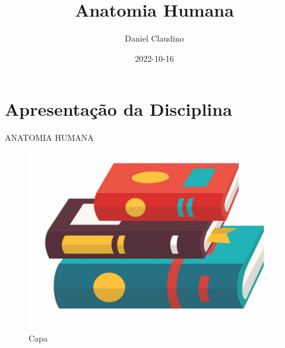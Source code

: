 \documentclass[
]{book}
\title{Anatomia Humana}
\author{Daniel Claudino}
\date{2022-10-16}
\begin{document}
\maketitle

{
\setcounter{tocdepth}{1}
\tableofcontents
}
\hypertarget{apresentauxe7uxe3o-da-disciplina}{%
\chapter{Apresentação da Disciplina}\label{apresentauxe7uxe3o-da-disciplina}}

ANATOMIA HUMANA

\begin{figure}

{\centering \includegraphics[width=0.5\linewidth]{figuras/LIVRO-GENERICO} 

}

\caption{Capa}\label{fig:unnamed-chunk-1}
\end{figure}
\end{document}
